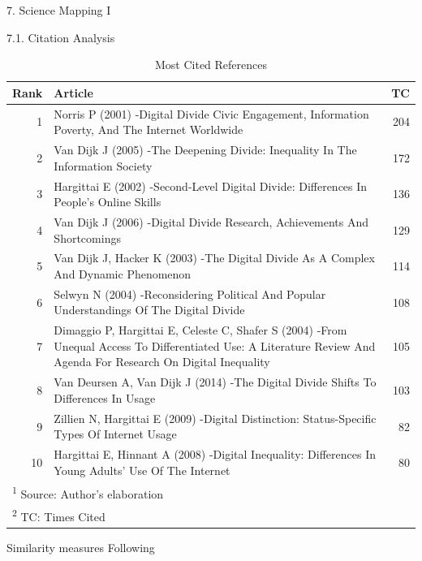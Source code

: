 \documentclass[
  ignorenonframetext,
]{beamer}
\begin{document}
\begin{frame}{7. Science Mapping I}
\protect\hypertarget{science-mapping-i}{}
\begin{block}{7.1. Citation Analysis}
\protect\hypertarget{citation-analysis}{}
\begin{table}[!h]

\caption{\label{tab:Most cited refs}Most Cited References}
\centering
\fontsize{5}{7}\selectfont
\begin{tabular}[t]{r|p{9cm}|r}
\hline
\textbf{Rank} & \textbf{Article} & \textbf{TC}\\
\hline
1 & Norris P (2001) -Digital Divide Civic Engagement, Information Poverty, And The Internet Worldwide & 204\\
\hline
2 & Van Dijk J (2005) -The Deepening Divide: Inequality In The Information Society & 172\\
\hline
3 & Hargittai E (2002) -Second-Level Digital Divide: Differences In People's Online Skills & 136\\
\hline
4 & Van Dijk J (2006) -Digital Divide Research, Achievements And Shortcomings & 129\\
\hline
5 & Van Dijk J, Hacker K (2003) -The Digital Divide As A Complex And Dynamic Phenomenon & 114\\
\hline
6 & Selwyn N (2004) -Reconsidering Political And Popular Understandings Of The Digital Divide & 108\\
\hline
7 & Dimaggio P, Hargittai E, Celeste C, Shafer S (2004) -From Unequal Access To Differentiated Use: A Literature Review And Agenda For Research On Digital Inequality & 105\\
\hline
8 & Van Deursen A, Van Dijk J (2014) -The Digital Divide Shifts To Differences In Usage & 103\\
\hline
9 & Zillien N, Hargittai E (2009) -Digital Distinction: Status-Specific Types Of Internet Usage & 82\\
\hline
10 & Hargittai E, Hinnant A (2008) -Digital Inequality: Differences In Young Adults' Use Of The Internet & 80\\
\hline
\multicolumn{3}{l}{\textsuperscript{1} Source: Author's elaboration}\\
\multicolumn{3}{l}{\textsuperscript{2} TC: Times Cited}\\
\end{tabular}
\end{table}
\end{block}

\begin{block}{Similarity measures}
\protect\hypertarget{similarity-measures}{}
Following \citet{kammerer2021}


\end{block}
\end{frame}
\end{document}
